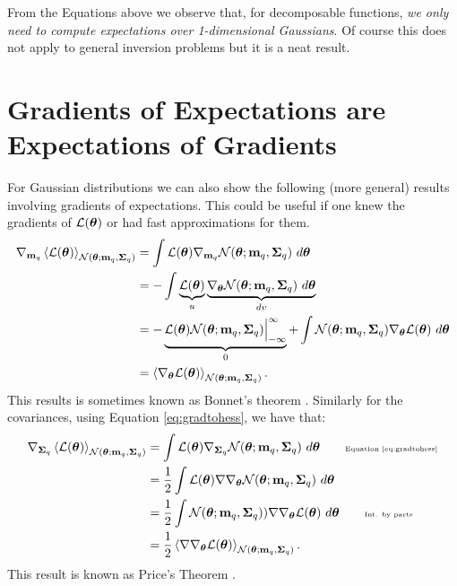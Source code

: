 From the Equations above we observe that, for decomposable functions, \emph{we only need to compute expectations over 1-dimensional Gaussians}. Of course this does not apply to general inversion problems but it is a neat result.
%
\section{Gradients of Expectations are Expectations of Gradients}
For Gaussian distributions we can also show the following (more general) results involving gradients of expectations. This could be
useful if one knew the gradients of $\mathcal{L}(\boldsymbol{ \theta })$ or had fast approximations for them.
\begin{align}
	\nabla_{\mathbf{m}_{q}} \left\langle \mathcal{L}(\boldsymbol{ \theta }) \right\rangle_{\mathcal{N}(\boldsymbol{ \theta }; \mathbf{m}_{q}, \mathbf{\Sigma}_{q})} 
	&= \int \mathcal{L}(\boldsymbol{ \theta })  \nabla_{\mathbf{m}_{q}} \mathcal{N}(\boldsymbol{ \theta }; \mathbf{m}_{q}, \mathbf{\Sigma}_{q})   \ d \boldsymbol{ \theta } \\
	& = - \int \underbrace{\mathcal{L}(\boldsymbol{ \theta })}_{u}  \underbrace{ \nabla_{\boldsymbol{ \theta }} \mathcal{N}(\boldsymbol{ \theta }; \mathbf{m}_{q}, \mathbf{\Sigma}_{q})   \ d \boldsymbol{ \theta }}_{dv} \\
	&= - \underbrace{ \mathcal{L}(\boldsymbol{ \theta }) \mathcal{N}(\boldsymbol{ \theta }; \mathbf{m}_{q}, \mathbf{\Sigma}_{q})  \Big|_{-\infty}^{\infty}}_{0} + \int \mathcal{N}(\boldsymbol{ \theta }; \mathbf{m}_{q}, \mathbf{\Sigma}_{q}) \nabla_{\boldsymbol{ \theta }}\mathcal{L}(\boldsymbol{ \theta }) \ d \boldsymbol{ \theta } \\
	& = \left\langle \nabla_{\boldsymbol{ \theta }} \mathcal{L}(\boldsymbol{ \theta }) \right\rangle_{\mathcal{N}(\boldsymbol{ \theta }; \mathbf{m}_{q}, \mathbf{\Sigma}_{q})} \text{.}
\end{align}
This results is sometimes known as Bonnet's theorem \cite{bonnet-64}.
%
Similarly for the covariances, using Equation \eqref{eq:gradtohess}, we have that:
\begin{align}
	\gradient_{\Sigmaq} \Eb{\calL(\vectheta)}_{\Normal(\vectheta; \mq, \Sigmaq)}  
	&=  \int   \calL(\vectheta)  \gradient_{\Sigmaq} \Normal(\vectheta; \mq, \Sigmaq)  \ d \vectheta \qquad \text{\tiny Equation \eqref{eq:gradtohess}} \\
	&= \frac{1}{2} \int \calL(\vectheta)\hessian_{\vectheta}  \Normal(\vectheta; \mq, \Sigmaq) \ d \vectheta  \\
	& = \frac{1}{2} \int   \Normal(\vectheta; \mq, \Sigmaq) )\hessian_{\vectheta} \calL(\vectheta) \ d \vectheta \qquad \text{\tiny Int. by parts} \\
	& = \frac{1}{2} \Eb{\hessian_{\vectheta} \calL(\vectheta)}_{\Normal(\vectheta; \mq, \Sigmaq)} \text{.}
\end{align}
This result is known as Price's Theorem \cite{price-58}.



